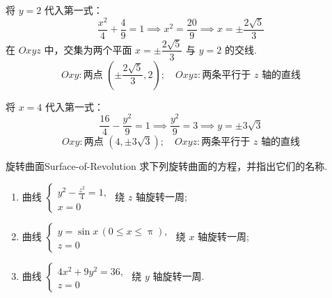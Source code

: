 \begin{solution}

    将 $y=2$ 代入第一式：
    \begin{equation}
        \dfrac{x^2}{4} + \dfrac{4}{9} = 1 \implies x^2 = \dfrac{20}{9} \implies x = \pm \dfrac{2\sqrt{5}}{3}
    \end{equation}
    在 $Oxyz$ 中，交集为两个平面 $x = \pm \dfrac{2\sqrt{5}}{3}$ 与 $y=2$ 的交线.
    \begin{equation}
        \boxed{Oxy: \text{两点 } \left( \pm \dfrac{2\sqrt{5}}{3}, 2 \right); \quad Oxyz: \text{两条平行于 } z \text{ 轴的直线}}
    \end{equation}


    将 $x=4$ 代入第一式：
    \begin{equation}
        \dfrac{16}{4} - \dfrac{y^2}{9} = 1 \implies \dfrac{y^2}{9} = 3 \implies y = \pm 3\sqrt{3}
    \end{equation}
    \begin{equation}
        \boxed{Oxy: \text{两点 } (4, \pm 3\sqrt{3}); \quad Oxyz: \text{两条平行于 } z \text{ 轴的直线}}
    \end{equation}
\end{solution}


\begin{problem}{旋转曲面}{Surface-of-Revolution}
    求下列旋转曲面的方程，并指出它们的名称.
    \begin{enumerate}
        \item 曲线 $\begin{cases} y^2 - \frac{z^2}{4} = 1, \\ x = 0 \end{cases}$ 绕 $z$ 轴旋转一周;
        \item 曲线 $\begin{cases} y = \sin x \, (0 \le x \le \uppi), \\ z = 0 \end{cases}$ 绕 $x$ 轴旋转一周;
        \item 曲线 $\begin{cases} 4x^2 + 9y^2 = 36, \\ z = 0 \end{cases}$ 绕 $y$ 轴旋转一周.
    \end{enumerate}
\end{problem}

